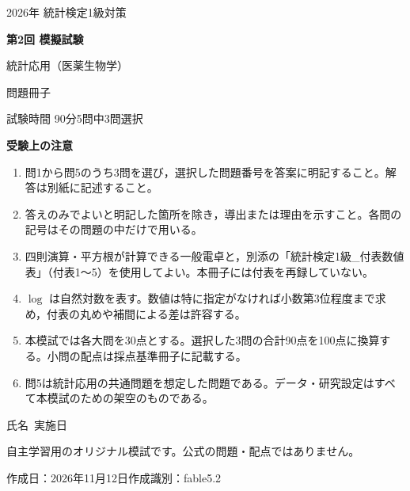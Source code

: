 \documentclass[a4paper,10pt]{ltjsarticle}
\begin{document}
\setlength{\abovedisplayskip}{5pt plus 1pt minus 2pt}\setlength{\belowdisplayskip}{5pt plus 1pt minus 2pt}\setlength{\abovedisplayshortskip}{2pt plus 1pt}\setlength{\belowdisplayshortskip}{4pt plus 1pt minus 1pt}
\thispagestyle{empty}
\begin{center}
\vspace*{12mm}
{\large 2026年 統計検定1級対策}\par\vspace{8mm}
{\Huge\bfseries 第2回 模擬試験}\par\vspace{7mm}
{\LARGE 統計応用（医薬生物学）}\par\vspace{6mm}
{\Large 問題冊子}\par\vspace{12mm}
{\large 試験時間 90分\qquad 5問中3問選択}
\end{center}
\vspace{8mm}
\noindent\textbf{受験上の注意}
\begin{enumerate}[label=\arabic*.,leftmargin=2em,itemsep=0.8em]
\item 問1から問5のうち3問を選び，選択した問題番号を答案に明記すること。解答は別紙に記述すること。
\item 答えのみでよいと明記した箇所を除き，導出または理由を示すこと。各問の記号はその問題の中だけで用いる。
\item 四則演算・平方根が計算できる一般電卓と，別添の「統計検定1級\_付表数値表」（付表1〜5）を使用してよい。本冊子には付表を再録していない。
\item $\log$ は自然対数を表す。数値は特に指定がなければ小数第3位程度まで求め，付表の丸めや補間による差は許容する。
\item 本模試では各大問を30点とする。選択した3問の合計90点を100点に換算する。小問の配点は採点基準冊子に記載する。
\item 問5は統計応用の共通問題を想定した問題である。データ・研究設定はすべて本模試のための架空のものである。
\end{enumerate}
\vfill
\begin{center}
氏名\ \underline{\hspace{55mm}}\qquad 実施日\ \underline{\hspace{35mm}}\par\vspace{8mm}
\small 自主学習用のオリジナル模試です。公式の問題・配点ではありません。\par
作成日：2026年11月12日\qquad 作成識別：fable5.2
\end{center}
\newpage
\end{document}
